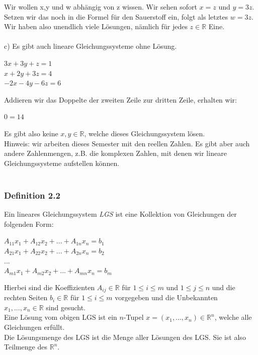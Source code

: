 \documentclass{article}
\begin{document}
Wir wollen x,y und w abhängig von z wissen. Wir sehen sofort $x=z$ und $y=3z$. Setzen wir das noch in die Formel für den Sauerstoff ein, folgt als letztes $w=3z$. \\
Wir haben also unendlich viele Lösungen, nämlich für jedes $z \in \mathbb{R}$ Eine. \\
\\
c) Es gibt auch lineare Gleichungssysteme ohne Lösung. \\
\begin{center}
    $3x + 3y + z = 1$ \\
    $x + 2y + 3z = 4$ \\
    $-2x -4y -6z = 6$ \\
\end{center}
Addieren wir das Doppelte der zweiten Zeile zur dritten Zeile, erhalten wir:
\begin{center}
    $0 = 14$
\end{center}
Es gibt also keine $x,y \in \mathbb{R}$, welche dieses Gleichungssystem lösen. \\
Hinweis: wir arbeiten dieses Semester mit den reellen Zahlen. Es gibt aber auch andere Zahlenmengen, z.B. die komplexen Zahlen, mit denen wir lineare Gleichungssysteme aufstellen können. \\
\\
\subsubsection*{Definition 2.2}
Ein lineares Gleichungssystem \textit{LGS} ist eine Kollektion von Gleichungen der folgenden Form: \\
\begin{center}
    $A_{11}x_1 + A_{12}x_2 + ... + A_{1n}x_n = b_1$ \\
    $A_{21}x_1 + A_{22}x_2 + ... + A_{2n}x_n = b_2$ \\
    ... \\
    $A_{m1}x_1 + A_{m2}x_2 + ... + A_{mn}x_n = b_m$ \\
\end{center}
Hierbei sind die Koeffizienten $A_{ij} \in \mathbb{R}$ für $1 \leq i \leq m$ und $1 \leq j \leq n$ und die rechten Seiten $b_i \in \mathbb{R}$ für $1 \leq i \leq m$ vorgegeben und die Unbekannten $x_1, ..., x_n \in \mathbb{R}$ sind gesucht. \\
Eine Lösung vom obigen LGS ist ein $n$-Tupel $x = (x_1, ..., x_n) \in \mathbb{R}^n$, welche alle Gleichungen erfüllt. \\
Die Lösungsmenge des LGS ist die Menge aller Lösungen des LGS. Sie ist also Teilmenge des $\mathbb{R}^n$. \\
\end{document}
